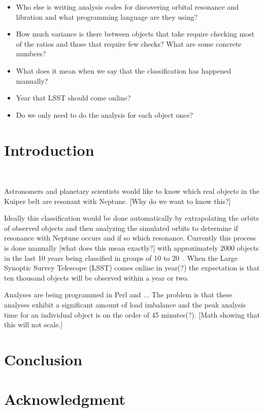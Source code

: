 \documentclass[conference]{IEEEtran}
\begin{document}
\begin{itemize}
\item Who else is writing analysis codes for discovering orbital resonance and libration and
what programming language are they using?
\item How much variance is there between objects that take require checking most of the
ratios and those that require few checks?  What are some concrete numbers?
\item What does it mean when we say that the classification has happened manually?
\item Year that LSST should come online?
\item Do we only need to do the analysis for each object once?
\end{itemize}

\section{Introduction}

~\cite{ChapelOverviewJan13}

Astronomers and planetary scientists would like to know which real
objects in the Kuiper belt are resonant with Neptune.
[Why do we want to know this?]

Ideally this classification would be done automatically by 
extrapolating the orbits of observed objects and then analyzing
the simulated orbits to determine if resonance with Neptune occurs
and if so which resonance.  Currently this process is done manually
[what does this mean exactly?] with approximately
2000 objects in the last 10 years being classified in
groups of 10 to 20~\cite{ClassificationCite}.
When the Large Synoptic Survey Telescope (LSST) comes online in  year(?)
the expectation is that ten thousand objects
will be observed within a year or two.

Analyses are being programmed in Perl and ...  The problem
is that these analyses exhibit a significant amount of load imbalance
and the peak analysis time for an individual object is 
on the order of 45 minutes(?).
[Math showing that this will not scale.]



\section{Conclusion}




\section*{Acknowledgment}




\end{document}
